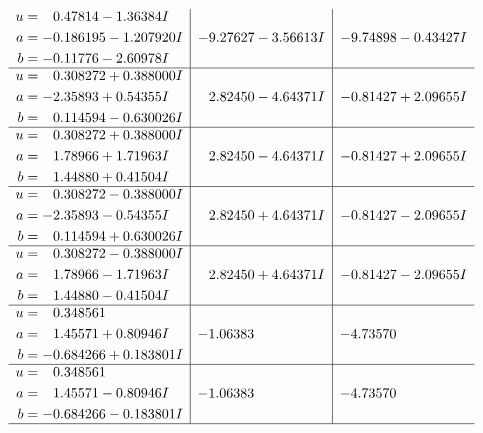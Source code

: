 \documentclass[1p]{elsarticle_modified}
\theoremstyle{definition}
\begin{document}
$$\begin{array}{c|c|c}
\begin{aligned}
u &= \phantom{-}0.47814 - 1.36384 I \\
a &= -0.186195 - 1.207920 I \\
b &= -0.11776 - 2.60978 I\end{aligned}
 & -9.27627 - 3.56613 I & -9.74898 - 0.43427 I \\ \hline\begin{aligned}
u &= \phantom{-}0.308272 + 0.388000 I \\
a &= -2.35893 + 0.54355 I \\
b &= \phantom{-}0.114594 - 0.630026 I\end{aligned}
 & \phantom{-}2.82450 - 4.64371 I & -0.81427 + 2.09655 I \\ \hline\begin{aligned}
u &= \phantom{-}0.308272 + 0.388000 I \\
a &= \phantom{-}1.78966 + 1.71963 I \\
b &= \phantom{-}1.44880 + 0.41504 I\end{aligned}
 & \phantom{-}2.82450 - 4.64371 I & -0.81427 + 2.09655 I \\ \hline\begin{aligned}
u &= \phantom{-}0.308272 - 0.388000 I \\
a &= -2.35893 - 0.54355 I \\
b &= \phantom{-}0.114594 + 0.630026 I\end{aligned}
 & \phantom{-}2.82450 + 4.64371 I & -0.81427 - 2.09655 I \\ \hline\begin{aligned}
u &= \phantom{-}0.308272 - 0.388000 I \\
a &= \phantom{-}1.78966 - 1.71963 I \\
b &= \phantom{-}1.44880 - 0.41504 I\end{aligned}
 & \phantom{-}2.82450 + 4.64371 I & -0.81427 - 2.09655 I \\ \hline\begin{aligned}
u &= \phantom{-}0.348561\phantom{ +0.000000I} \\
a &= \phantom{-}1.45571 + 0.80946 I \\
b &= -0.684266 + 0.183801 I\end{aligned}
 & -1.06383\phantom{ +0.000000I} & -4.73570\phantom{ +0.000000I} \\ \hline\begin{aligned}
u &= \phantom{-}0.348561\phantom{ +0.000000I} \\
a &= \phantom{-}1.45571 - 0.80946 I \\
b &= -0.684266 - 0.183801 I\end{aligned}
 & -1.06383\phantom{ +0.000000I} & -4.73570\phantom{ +0.000000I}\\
 \hline 
 \end{array}$$\newpage\newpage\renewcommand{\arraystretch}{1}
\end{document}
